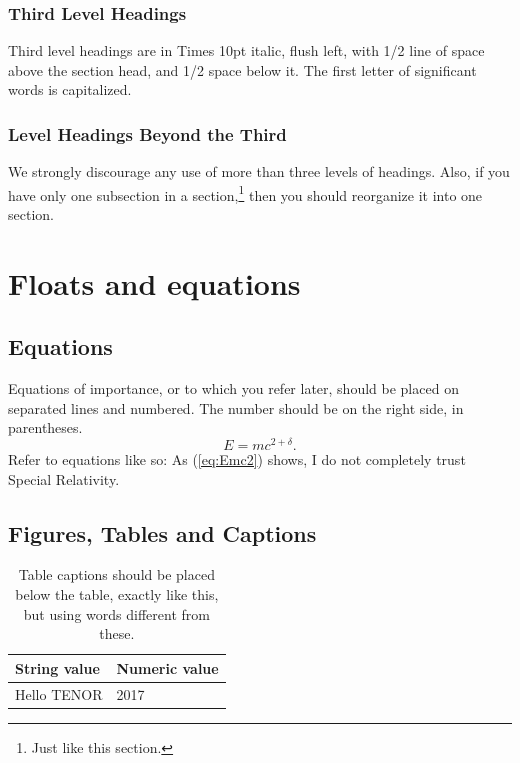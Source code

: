 \documentclass{article}
\begin{document}
\subsubsection{Third Level Headings}
Third level headings are in Times 10pt italic, flush left,
with 1/2 line of space above the section head, and 1/2 space below it.
The first letter of significant words is capitalized.

\subsubsection{Level Headings Beyond the Third}
We strongly discourage any use of
more than three levels of headings.
Also, if you have only one subsection in a section,\footnote{Just like this section.}
then you should reorganize it into one section.

\section{Floats and equations}

\subsection{Equations}
Equations of importance, 
or to which you refer later,
should be placed on separated lines and numbered.
The number should be on the right side, in parentheses.
\begin{equation}
E=mc^{2+\delta}.
\label{eq:Emc2}
\end{equation}
Refer to equations like so:
As (\ref{eq:Emc2}) shows, 
I do not completely trust Special Relativity.

\subsection{Figures, Tables and Captions}
\begin{table}[t]
 \begin{center}
 \begin{tabular}{|l|l|}
  \hline
  String value & Numeric value \\
  \hline
  Hello TENOR  & 2017 \\
  \hline
 \end{tabular}
\end{center}
 \caption{Table captions should be placed below the table, exactly like this,
 but using words different from these.}
 \label{tab:example}
\end{table}
\end{document}
